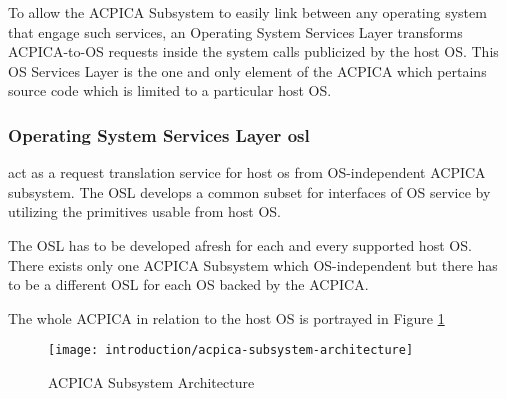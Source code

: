 To allow the ACPICA Subsystem to easily link between any operating system that engage such services, an Operating System Services Layer transforms ACPICA-to-OS requests inside the system calls publicized by the host OS. This OS Services Layer is the one and only element of the ACPICA which pertains source code which is limited to a particular host OS.

%
%
%
%
\subsubsection{Operating System Services Layer \gls{osl}}
 act as a request translation service for host os from OS-independent ACPICA subsystem. The OSL develops a common subset for interfaces of OS service by utilizing the primitives usable from host OS.

The OSL has to be developed afresh for each and every supported host OS. There exists only one ACPICA Subsystem which OS-independent but there has to be a different OSL for each OS backed by the ACPICA.

The whole ACPICA in relation to the host OS is portrayed in Figure \ref{fig:introduction-acpica-subsystem-architecture}

\begin{figure}[!htbp]
	\centering
	\texttt{[image: introduction/acpica-subsystem-architecture]}
	\caption{ACPICA Subsystem Architecture}\label{fig:introduction-acpica-subsystem-architecture}
\end{figure}

